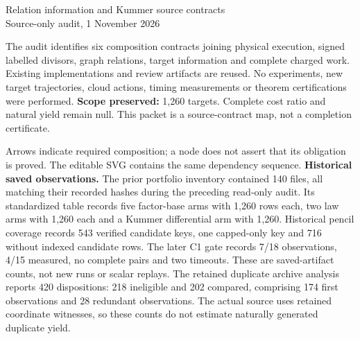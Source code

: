 \documentclass[10pt]{article}
\begin{document}
\begin{center}{\LARGE Relation information and Kummer source contracts}\\[6pt]Source-only audit, 1 November 2026\end{center}
The audit identifies six composition contracts joining physical execution, signed labelled divisors, graph relations, target information and complete charged work. Existing implementations and review artifacts are reused. No experiments, new target trajectories, cloud actions, timing measurements or theorem certifications were performed.
\textbf{Scope preserved:} 1,260 targets. Complete cost ratio and natural yield remain null. This packet is a source-contract map, not a completion certificate.
\begin{center}\end{center}
Arrows indicate required composition; a node does not assert that its obligation is proved. The editable SVG contains the same dependency sequence.
\textbf{Historical saved observations.} The prior portfolio inventory contained 140 files, all matching their recorded hashes during the preceding read-only audit. Its standardized table records five factor-base arms with 1,260 rows each, two law arms with 1,260 each and a Kummer differential arm with 1,260. Historical pencil coverage records 543 verified candidate keys, one capped-only key and 716 without indexed candidate rows. The later C1 gate records 7/18 observations, 4/15 measured, no complete pairs and two timeouts. These are saved-artifact counts, not new runs or scalar replays.
The retained duplicate archive analysis reports 420 dispositions: 218 ineligible and 202 compared, comprising 174 first observations and 28 redundant observations. The actual source uses retained coordinate witnesses, so these counts do not estimate naturally generated duplicate yield.
\newpage
\end{document}
